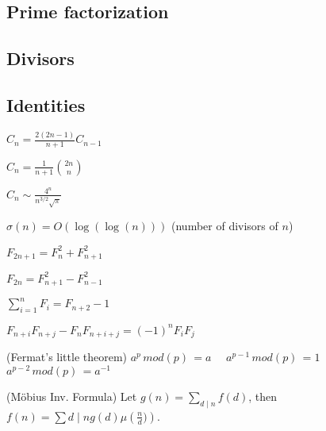 \subsection{Prime factorization}
\subsection{Divisors}

\subsection{Identities}
{
	$C_n = \frac{2(2n-1)}{n+1} C_{n-1}$

	$C_n = \frac{1}{n+1} \binom{2n}{n}$

	$C_n \sim \frac{4^n}{n^{3/2}\sqrt{\pi}}$

	$\sigma(n) = O(\log(\log(n)))$ (number of divisors of $n$)

	$F_{2n+1} = F_{n}^2 + F_{n+1}^2$

	$F_{2n} = F_{n+1}^2 - F_{n-1}^2$

	$\sum_{i=1}^n F_i = F_{n+2}-1$

	$F_{n+i}F_{n+j} - F_nF_{n+i+j} = (-1)^n F_iF_j$

    (Fermat's little theorem)
    $a^{p}\,mod(p)\,= a\quad$
    $a^{p-1}\,mod(p)\,=1\quad$
    $a^{p-2}\,mod(p)\,=a^{-1}$

	(Möbius Inv. Formula)
	Let $g(n) = \sum_{d\mid n} f(d)$, then $f(n)=\sum{d\mid n} g(d) \mu\left(\frac{n}{d})\right)$.
}
